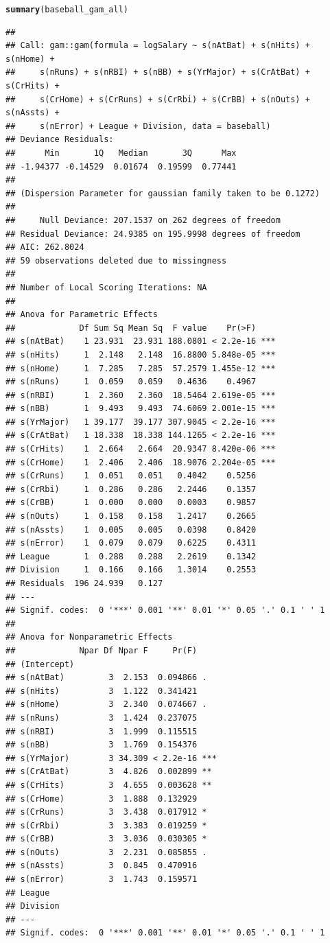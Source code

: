 \documentclass{article}\usepackage[]{graphicx}\usepackage[]{color}
\makeatletter
\newcommand{\hlstd}[1]{\textcolor[rgb]{0.345,0.345,0.345}{#1}}%
\newcommand{\hlkwd}[1]{\textcolor[rgb]{0.737,0.353,0.396}{\textbf{#1}}}%
\newenvironment{kframe}{%
 \def\at@end@of@kframe{}%
 \ifinner\ifhmode%
  \def\at@end@of@kframe{\end{minipage}}%
  \begin{minipage}{\columnwidth}%
 \fi\fi%
 \def\FrameCommand##1{\hskip\@totalleftmargin \hskip-\fboxsep
 \colorbox{shadecolor}{##1}\hskip-\fboxsep
     \hskip-\linewidth \hskip-\@totalleftmargin \hskip\columnwidth}%
 \MakeFramed {\advance\hsize-\width
   \@totalleftmargin\z@ \linewidth\hsize
   \@setminipage}}%
 {\par\unskip\endMakeFramed%
 \at@end@of@kframe}
\newenvironment{knitrout}{}{} %
\makeatother
\begin{document}
\begin{knitrout}
\begin{kframe}
\begin{alltt}
\hlkwd{summary}\hlstd{(baseball_gam_all)}
\end{alltt}
\begin{verbatim}
## 
## Call: gam::gam(formula = logSalary ~ s(nAtBat) + s(nHits) + s(nHome) + 
##     s(nRuns) + s(nRBI) + s(nBB) + s(YrMajor) + s(CrAtBat) + s(CrHits) + 
##     s(CrHome) + s(CrRuns) + s(CrRbi) + s(CrBB) + s(nOuts) + s(nAssts) + 
##     s(nError) + League + Division, data = baseball)
## Deviance Residuals:
##      Min       1Q   Median       3Q      Max 
## -1.94377 -0.14529  0.01674  0.19599  0.77441 
## 
## (Dispersion Parameter for gaussian family taken to be 0.1272)
## 
##     Null Deviance: 207.1537 on 262 degrees of freedom
## Residual Deviance: 24.9385 on 195.9998 degrees of freedom
## AIC: 262.8024 
## 59 observations deleted due to missingness 
## 
## Number of Local Scoring Iterations: NA 
## 
## Anova for Parametric Effects
##             Df Sum Sq Mean Sq  F value    Pr(>F)    
## s(nAtBat)    1 23.931  23.931 188.0801 < 2.2e-16 ***
## s(nHits)     1  2.148   2.148  16.8800 5.848e-05 ***
## s(nHome)     1  7.285   7.285  57.2579 1.455e-12 ***
## s(nRuns)     1  0.059   0.059   0.4636    0.4967    
## s(nRBI)      1  2.360   2.360  18.5464 2.619e-05 ***
## s(nBB)       1  9.493   9.493  74.6069 2.001e-15 ***
## s(YrMajor)   1 39.177  39.177 307.9045 < 2.2e-16 ***
## s(CrAtBat)   1 18.338  18.338 144.1265 < 2.2e-16 ***
## s(CrHits)    1  2.664   2.664  20.9347 8.420e-06 ***
## s(CrHome)    1  2.406   2.406  18.9076 2.204e-05 ***
## s(CrRuns)    1  0.051   0.051   0.4042    0.5256    
## s(CrRbi)     1  0.286   0.286   2.2446    0.1357    
## s(CrBB)      1  0.000   0.000   0.0003    0.9857    
## s(nOuts)     1  0.158   0.158   1.2417    0.2665    
## s(nAssts)    1  0.005   0.005   0.0398    0.8420    
## s(nError)    1  0.079   0.079   0.6225    0.4311    
## League       1  0.288   0.288   2.2619    0.1342    
## Division     1  0.166   0.166   1.3014    0.2553    
## Residuals  196 24.939   0.127                       
## ---
## Signif. codes:  0 '***' 0.001 '**' 0.01 '*' 0.05 '.' 0.1 ' ' 1
## 
## Anova for Nonparametric Effects
##             Npar Df Npar F     Pr(F)    
## (Intercept)                             
## s(nAtBat)         3  2.153  0.094866 .  
## s(nHits)          3  1.122  0.341421    
## s(nHome)          3  2.340  0.074667 .  
## s(nRuns)          3  1.424  0.237075    
## s(nRBI)           3  1.999  0.115515    
## s(nBB)            3  1.769  0.154376    
## s(YrMajor)        3 34.309 < 2.2e-16 ***
## s(CrAtBat)        3  4.826  0.002899 ** 
## s(CrHits)         3  4.655  0.003628 ** 
## s(CrHome)         3  1.888  0.132929    
## s(CrRuns)         3  3.438  0.017912 *  
## s(CrRbi)          3  3.383  0.019259 *  
## s(CrBB)           3  3.036  0.030305 *  
## s(nOuts)          3  2.231  0.085855 .  
## s(nAssts)         3  0.845  0.470916    
## s(nError)         3  1.743  0.159571    
## League                                  
## Division                                
## ---
## Signif. codes:  0 '***' 0.001 '**' 0.01 '*' 0.05 '.' 0.1 ' ' 1
\end{verbatim}
\end{kframe}
\end{knitrout}
\end{document}
